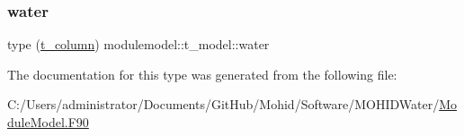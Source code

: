 \mbox{\label{structmodulemodel_1_1t__model_a59d87987e7ffbeb5b46799cb162e0e80}} 
\subsubsection{\texorpdfstring{water}{water}}
{\footnotesize\ttfamily type (\mbox{\hyperlink{structmodulemodel_1_1t__column}{t\+\_\+column}}) modulemodel\+::t\+\_\+model\+::water\hspace{0.3cm}{\ttfamily [private]}}



The documentation for this type was generated from the following file\+:\begin{DoxyCompactItemize}
\item 
C\+:/\+Users/administrator/\+Documents/\+Git\+Hub/\+Mohid/\+Software/\+M\+O\+H\+I\+D\+Water/\mbox{\hyperlink{_module_model_8_f90}{Module\+Model.\+F90}}\end{DoxyCompactItemize}
